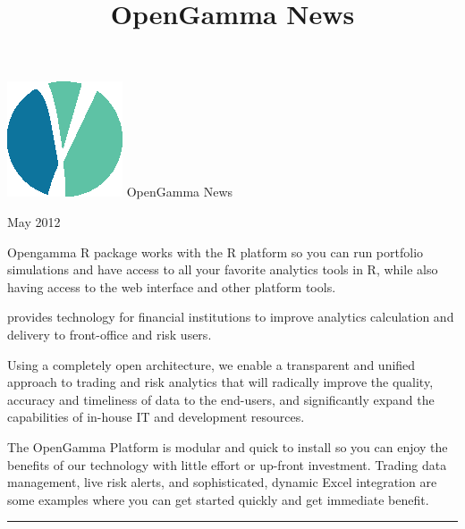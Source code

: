 \documentclass[custom, plainsections]{sciposter}
\title{OpenGamma News}
\begin{document}
\rmfamily

\begin{megasize}
\includegraphics{og-device.eps}
\hspace{0.1in}
OpenGamma News
\end{megasize} \hfill May 2012

\begin{multicols*}{3}

\small

 Opengamma R package works with the R platform so you can run portfolio simulations and have access to all your favorite analytics tools in R, while also having access to the web interface and other platform tools.

 provides technology for financial institutions to improve analytics calculation and delivery to front-office and risk users.

Using a completely open architecture, we enable a transparent and unified approach to trading and risk analytics that will radically improve the quality, accuracy and timeliness of data to the end-users, and significantly expand the capabilities of in-house IT and development resources.

The OpenGamma Platform is modular and quick to install so you can enjoy the benefits of our technology with little effort or up-front investment. Trading data management, live risk alerts, and sophisticated, dynamic Excel integration are some examples where you can get started quickly and get immediate benefit.

\vspace{0.5cm}
\hrule
\vspace{0.2cm}

\end{multicols*}

\pagebreak
\end{document}
